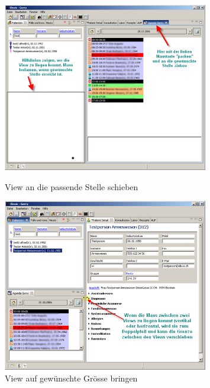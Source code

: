 \begin{figure}[h]
       \includegraphics[width=0.8\textwidth]{images/agendagewaehlt}
       \caption{View an die passende Stelle schieben}
       	\label{fig:moveview}
     \includegraphics[width=0.8\textwidth]{images/agendaanpassen}
       \caption{View auf gewünschte Grösse bringen}
       	\label{fig:sizeview}
     
   \end{figure}


